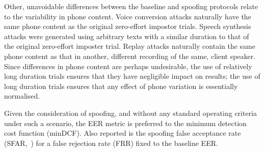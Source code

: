 

Other, unavoidable differences between the baseline and spoofing protocols relate to the variability in phone content.  Voice conversion attacks naturally have the same phone content as the original zero-effort impostor trials.  Speech synthesis attacks were generated using arbitrary texts with a similar duration to that of the original zero-effort imposter trial.  Replay attacks naturally contain the same phone content as that in another, different recording of the same, client speaker.  Since differences in phone content are perhaps undesirable, the use of relatively long duration trials ensures that they have negligible impact on results; the use of long duration trials ensures that any effect of phone variation is essentially normalised.  


Given the consideration of spoofing, and without any standard operating criteria under such a scenario, the EER metric is preferred to the minimum detection cost function (minDCF).  Also reported is the spoofing false acceptance rate (SFAR,~\cite{Johnson2010}) for a false rejection rate (FRR) fixed to the baseline EER.
